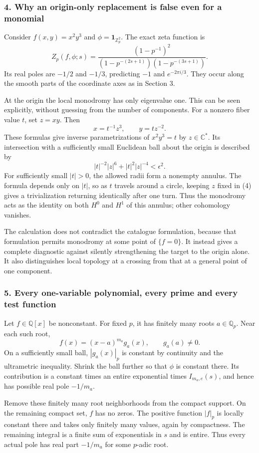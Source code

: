 \documentclass[11pt]{article}
\begin{document}
\subsubsection{4. Why an origin-only replacement is false even for a monomial}
Consider $f(x,y)=x^2y^3$ and $\phi=\mathbf1_{\mathbb Z_p^2}$. The exact zeta function is
\[
 Z_p(f,\phi;s)=
 \frac{(1-p^{-1})^2}{(1-p^{-(2s+1)})(1-p^{-(3s+1)})}.  \tag{3}
\]
Its real poles are $-1/2$ and $-1/3$, predicting $-1$ and $e^{-2\pi i/3}$. They occur along the smooth parts of the coordinate axes as in Section 3.

At the origin the local monodromy has only eigenvalue one. This can be seen explicitly, without guessing from the number of components. For a nonzero fiber value $t$, set $z=xy$. Then
\[
 x=t^{-1}z^3,\qquad y=t z^{-2}.                        \tag{4}
\]
These formulas give inverse parametrizations of $x^2y^3=t$ by $z\in\mathbb C^*$. Its intersection with a sufficiently small Euclidean ball about the origin is described by
\[
 |t|^{-2}|z|^6+|t|^2|z|^{-4}<\epsilon^2.
\]
For sufficiently small $|t|>0$, the allowed radii form a nonempty annulus. The formula depends only on $|t|$, so as $t$ travels around a circle, keeping $z$ fixed in (4) gives a trivialization returning identically after one turn. Thus the monodromy acts as the identity on both $H^0$ and $H^1$ of this annulus; other cohomology vanishes.

The calculation does not contradict the catalogue formulation, because that formulation permits monodromy at some point of $\{f=0\}$. It instead gives a complete diagnostic against silently strengthening the target to the origin alone. It also distinguishes local topology at a crossing from that at a general point of one component.

\subsubsection{5. Every one-variable polynomial, every prime and every test function}
Let $f\in\mathbb Q[x]$ be nonconstant. For fixed $p$, it has finitely many roots $a\in\mathbb Q_p$. Near each such root,
\[
 f(x)=(x-a)^{m_a}g_a(x),\qquad g_a(a)\ne0.
\]
On a sufficiently small ball, $|g_a(x)|_p$ is constant by continuity and the ultrametric inequality. Shrink the ball further so that $\phi$ is constant there. Its contribution is a constant times an entire exponential times $I_{m_a,e}(s)$, and hence has possible real pole $-1/m_a$.

Remove these finitely many root neighborhoods from the compact support. On the remaining compact set, $f$ has no zeros. The positive function $|f|_p$ is locally constant there and takes only finitely many values, again by compactness. The remaining integral is a finite sum of exponentials in $s$ and is entire. Thus every actual pole has real part $-1/m_a$ for some $p$-adic root.
\end{document}
